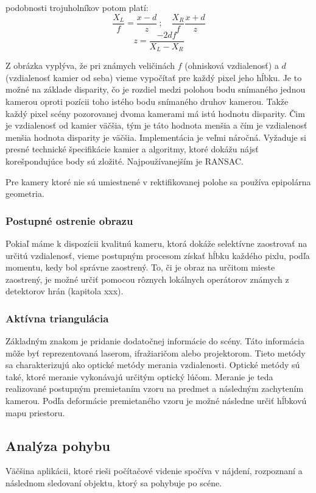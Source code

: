 podobnosti trojuholníkov potom platí:
$$\frac{X_L}{f}=\frac{x-d}{z}\ {;}\quad \frac{X_R}{f}\frac{x+d}{z}$$ 
$$ z=\frac{-2df}{X_L-X_R}$$

Z obrázka vyplýva, že pri známych veličinách $f$ (ohnisková vzdialenosť) a $d$ (vzdialenosť kamier od seba) vieme vypočítať pre každý pixel jeho hĺbku. Je to možné na základe disparity, čo je rozdiel medzi polohou bodu snímaného jednou kamerou oproti pozícii toho istého bodu snímaného druhov kamerou. Takže každý pixel scény pozorovanej dvoma kamerami má istú hodnotu disparity. Čim je vzdialenosť od kamier väčšia, tým je táto hodnota menšia a čím je vzdialenosť menšia hodnota disparity je väčšia. Implementácia je veľmi náročná. Vyžaduje si presné technické špecifikácie kamier a algoritmy, ktoré dokážu nájsť korešpondujúce body sú zložité. Najpoužívanejším je RANSAC. 

Pre kamery ktoré nie sú umiestnené v rektifikovanej  polohe sa používa epipolárna geometria. 


\subsubsection{Postupné ostrenie obrazu }
Pokiaľ máme k dispozícii kvalitnú kameru, ktorá dokáže selektívne zaostrovať na určitú vzdialenosť, vieme postupným procesom získať hĺbku každého pixlu, podľa momentu, kedy bol správne zaostrený. To, či je obraz na určitom mieste zaostrený, je možné určiť pomocou rôznych lokálnych operátorov známych z detektorov hrán (kapitola xxx). 


\subsubsection{Aktívna triangulácia }
Základným znakom je pridanie dodatočnej informácie do scény. Táto informácia môže byť reprezentovaná laserom, ifražiaričom alebo projektorom. Tieto metódy sa charakterizujú ako optické metódy merania vzdialenosti. Optické metódy sú také, ktoré meranie vykonávajú určitým optický lúčom.  Meranie je teda realizované postupným premietaním vzoru na predmet a následným zachytením kamerou. Podľa deformácie premietaného vzoru je možné následne určiť hĺbkovú mapu priestoru.

\subsection{Analýza pohybu }
Väčšina aplikácii, ktoré rieši počítačové videnie spočíva v nájdení, rozpoznaní a následnom sledovaní objektu, ktorý sa pohybuje po scéne. 

